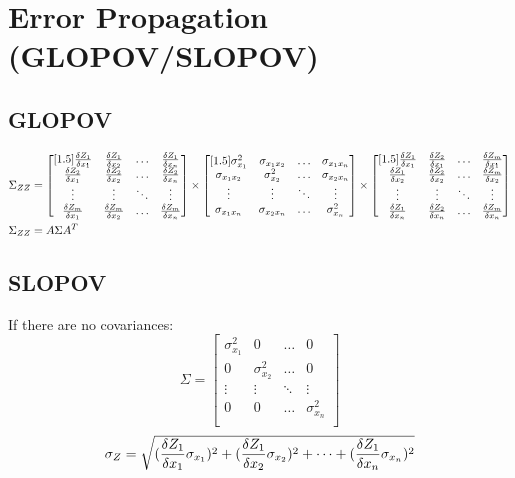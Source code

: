 \section{Error Propagation (GLOPOV/SLOPOV)}

\subsection{GLOPOV}
\begin{align*}
\Sigma_{ZZ} &= 
\begin{bmatrix}[1.5]
\frac{\delta Z_1}{\delta x_1} & \frac{\delta Z_1}{\delta x_2} & \hdots & \frac{\delta Z_1}{\delta x_n} \\
\frac{\delta Z_2}{\delta x_1} & \frac{\delta Z_2}{\delta x_2} & \hdots & \frac{\delta Z_2}{\delta x_n} \\
\vdots & \vdots & \ddots & \vdots \\
\frac{\delta Z_m}{\delta x_1} & \frac{\delta Z_m}{\delta x_2} & \hdots & \frac{\delta Z_m}{\delta x_n} \\
\end{bmatrix}
\times
\begin{bmatrix}[1.5]
\sigma^2_{x_{1}} & \sigma_{x_{1}x_{2}} & \hdots & \sigma_{x_{1}x_{n}} \\
\sigma_{x_{1}x_{2}} & \sigma^2_{x_{2}} & \hdots & \sigma_{x_{2}x_{n}} \\
\vdots & \vdots & \ddots & \vdots \\
\sigma_{x_{1}x_{n}} & \sigma_{x_{2}x_{n}} & \hdots & \sigma^2_{x_{n}} \\
\end{bmatrix}
\times
\begin{bmatrix}[1.5]
\frac{\delta Z_1}{\delta x_1} & \frac{\delta Z_2}{\delta x_1} & \hdots & \frac{\delta Z_m}{\delta x_1} \\
\frac{\delta Z_1}{\delta x_2} & \frac{\delta Z_2}{\delta x_2} & \hdots & \frac{\delta Z_m}{\delta x_2} \\
\vdots & \vdots & \ddots & \vdots \\
\frac{\delta Z_1}{\delta x_n} & \frac{\delta Z_2}{\delta x_n} & \hdots & \frac{\delta Z_m}{\delta x_n} \\
\end{bmatrix} \\
\Sigma_{ZZ} &= 
A\Sigma A^T
\end{align*}

\subsection{SLOPOV}
If there are no covariances:
\[
\Sigma = 
\begin{bmatrix}
\sigma^2_{x_{1}} & 0 & \hdots & 0 \\
0 & \sigma^2_{x_{2}} & \hdots & 0 \\
\vdots & \vdots & \ddots & \vdots \\
0 & 0 & \hdots & \sigma^2_{x_{n}} \\
\end{bmatrix}
\]
\[
\sigma_Z = \sqrt{(\frac{\delta Z_1}{\delta x_1} \sigma_{x_1})^2+(\frac{\delta Z_1}{\delta x_2} \sigma_{x_2})^2+\dots+(\frac{\delta Z_1}{\delta x_n} \sigma_{x_n})^2}
\]